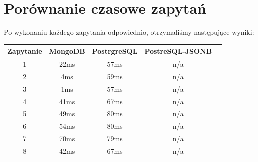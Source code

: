 \documentclass[11pt]{article}
\begin{document}
\section{Porównanie czasowe zapytań}
	Po wykonaniu każdego zapytania odpowiednio, otrzymaliśmy następujące wyniki:
	\begin{table}[!ht]
	\begin{center}
		\begin{tabular}{ccccc}
			\toprule
			Zapytanie & MongoDB & PostrgreSQL & PostreSQL-JSONB &  \\
			\midrule
			1         & 22ms    & 57ms        & n/a             &  \\
			\midrule
			2         & 4ms     & 59ms        & n/a             &  \\
			\midrule
			3		  & 1ms     & 57ms        & n/a             &  \\
			\midrule
			4		  & 41ms    & 67ms        & n/a             &  \\
			\midrule
			5		  & 49ms    & 80ms        & n/a             &  \\
			\midrule
			6		  & 54ms    & 80ms        & n/a             &  \\
			\midrule
			7		  & 70ms    & 79ms        & n/a             &  \\
			\midrule
			8		  & 42ms    & 67ms        & n/a             &  \\
			\bottomrule
		\end{tabular}
	\end{center}
	\end{table}
\end{document}
